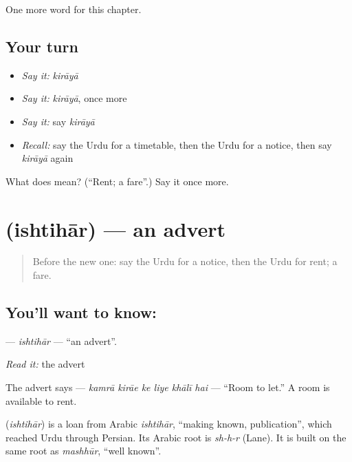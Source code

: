 \begin{grammarlens}[title={What you've built}]
One more word for this chapter.
\end{grammarlens}

\subsection*{Your turn}
\begin{itemize}
\raggedright
  \item \emph{Say it:} \emph{kirāyā}
  \item \emph{Say it:} \emph{kirāyā}, once more
  \item \emph{Say it:} say \emph{kirāyā}
  \item \emph{Recall:} say the Urdu for a timetable, then the Urdu for a notice, then say \emph{kirāyā} again
\end{itemize}

\begin{tcolorbox}[breakable,colback=teal!4,colframe=teal!35!black,title={Before you move on}]
What does  mean? (\textquotedblleft{}Rent; a fare\textquotedblright{}.) Say it once more.
\end{tcolorbox}
\section[\texorpdfstring{\ur{اشتہار} (ishtihār)}{اشتہار (ishtihār)}]{ (ishtihār) — an advert}

\label{lesson:UR-C146-ishtihar}



\begin{quote}
Before the new one: say the Urdu for a notice, then the Urdu for rent; a fare.
\end{quote}

\subsection*{You'll want to know: }
\textbf{} — \emph{ishtihār} — \textquotedblleft{}an advert\textquotedblright{}.

\emph{Read it:} the advert

The advert says \textbf{     } — \emph{kamrā kirāe ke liye khālī hai} — \textquotedblleft{}Room to let.\textquotedblright{} A room is available to rent.

\begin{cousinweb}
\textbf{} (\emph{ishtihār}) is a loan from Arabic \emph{ishtihār}, \textquotedblleft{}making known, publication\textquotedblright{}, which reached Urdu through Persian. Its Arabic root is \emph{sh-h-r} (Lane). It is built on the same root as \emph{mashhūr}, \textquotedblleft{}well known\textquotedblright{}.
\end{cousinweb}

